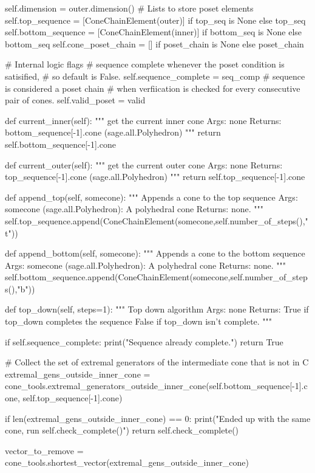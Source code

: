 \documentclass{TC}
\begin{document}
\begin{SAGE}
		self.dimension = outer.dimension()
		# Lists to store poset elements
		self.top_sequence = [ConeChainElement(outer)] if top_seq is None else top_seq
		self.bottom_sequence = [ConeChainElement(inner)] if bottom_seq is None else bottom_seq
		self.cone_poset_chain = [] if poset_chain is None else poset_chain

		# Internal logic flags
		# sequence complete whenever the poset condition is satisified,
		# so default is False.
		self.sequence_complete = seq_comp 
		# sequence is considered a poset chain 
		# when verfiication is checked for every consecutive pair of cones.
		self.valid_poset = valid 

	def current_inner(self):
		""" get the current inner cone 
		Args: none
		Returns: bottom_sequence[-1].cone (sage.all.Polyhedron)
		"""
		return self.bottom_sequence[-1].cone


	def current_outer(self):
		""" get the current outer cone 
		Args: none
		Returns: top_sequence[-1].cone (sage.all.Polyhedron)
		"""
		return self.top_sequence[-1].cone


	def append_top(self, somecone):
		""" Appends a cone to the top sequence 
		Args:
			somecone (sage.all.Polyhedron): A polyhedral cone
		Returns: none.
		"""
		self.top_sequence.append(ConeChainElement(somecone,self.number_of_steps(),"t"))


	def append_bottom(self, somecone):
		""" Appends a cone to the bottom sequence 
		Args:
			somecone (sage.all.Polyhedron): A polyhedral cone
		Returns: none.
		"""
		self.bottom_sequence.append(ConeChainElement(somecone,self.number_of_steps(),"b"))

	def top_down(self, steps=1):
		""" Top down algorithm
		Args: none
		Returns: True if top_down completes the sequence
				 False if top_down isn't complete. 
		"""
		
		if self.sequence_complete:
			print("Sequence already complete.")
			return True

		# Collect the set of extremal generators of the intermediate cone that is not in C
		extremal_gens_outside_inner_cone = 	cone_tools.extremal_generators_outside_inner_cone(self.bottom_sequence[-1].cone, self.top_sequence[-1].cone)
		
		if len(extremal_gens_outside_inner_cone) == 0:
			print("Ended up with the same cone, run self.check_complete()")
			return self.check_complete()
			

		vector_to_remove = cone_tools.shortest_vector(extremal_gens_outside_inner_cone)
		

\end{SAGE}
\end{document}
